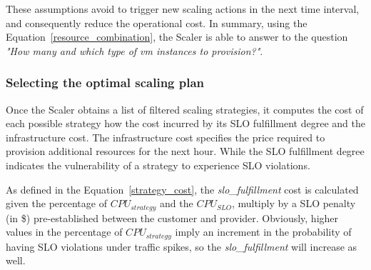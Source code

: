 These assumptions avoid to trigger new scaling actions in the next time interval, and consequently reduce the operational cost. In summary, using the Equation~\ref{resource_combination}, the Scaler is able to answer to the question \emph{"How many and which type of vm instances to provision?"}.


\subsubsection{Selecting the optimal scaling plan}



Once the Scaler obtains a list of filtered scaling strategies, it computes the cost of each possible strategy how the cost incurred by its SLO fulfillment degree and the infrastructure cost. The infrastructure cost specifies the price required to provision additional resources for the next hour. While the SLO fulfillment degree indicates the vulnerability of a strategy to experience SLO violations. 

As defined in the Equation~\ref{strategy_cost}, the \emph{slo\_fulfillment} cost is calculated given the percentage of \emph{$CPU_{strategy}$} and the \emph{$CPU_{SLO}$}, multiply by a SLO penalty (in \$)  pre-established between the customer and provider. Obviously, higher values in the percentage of \emph{$CPU_{strategy}$} imply an increment in the probability of having SLO violations under traffic spikes, so the \emph{slo\_fulfillment} will increase as well. 


